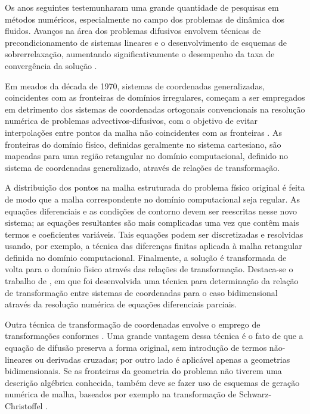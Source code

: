 Os anos seguintes testemunharam uma grande quantidade de pesquisas em métodos numéricos, especialmente no campo dos problemas de dinâmica dos fluidos. Avanços na área dos
problemas difusivos envolvem técnicas de precondicionamento de sistemas lineares e o desenvolvimento de esquemas de sobrerrelaxação, aumentando significativamente
o desempenho da taxa de convergência da solução \citep{artigo_frankel, artigo_fedorenko}.

Em meados da década de 1970, sistemas de coordenadas generalizadas, coincidentes com as fronteiras de domínios irregulares,
começam a ser empregados em detrimento dos sistemas de coordenadas ortogonais convencionais na resolução numérica de problemas advectivos-difusivos,
com o objetivo de evitar interpolações entre pontos da malha não coincidentes com as fronteiras \citep{livro_maliska}. As fronteiras do domínio físico, definidas geralmente no sistema 
cartesiano, são mapeadas para uma região retangular no domínio computacional, definido no sistema de coordenadas generalizado, através de relações de transformação.

A distribuição dos pontos na malha estruturada do problema físico original é feita de modo que a malha correspondente no domínio computacional seja regular. 
As equações diferenciais e as condições de contorno devem ser reescritas nesse novo sistema; as equações resultantes são mais complicadas uma vez que contêm mais
termos e coeficientes variáveis. Tais equações podem ser discretizadas e resolvidas usando, por exemplo, a técnica das diferenças finitas aplicada à malha retangular definida no domínio computacional.
Finalmente, a solução é transformada de volta para o domínio físico através das relações de transformação. Destaca-se o trabalho de \citet{artigo_thompson},
em que foi desenvolvida uma técnica para determinação da relação de transformação entre sistemas de coordenadas para o caso bidimensional através da resolução numérica de equações diferenciais parciais.

Outra técnica de transformação de coordenadas envolve o emprego de transformações conformes \citep{livro_numerical_grid}. Uma grande vantagem
dessa técnica é o fato de que a equação de difusão preserva a forma original, sem introdução de termos não-lineares ou derivadas cruzadas;
por outro lado é aplicável apenas a geometrias bidimensionais. Se as fronteiras da geometria do problema não tiverem uma descrição algébrica
conhecida, também deve se fazer uso de esquemas de geração numérica de malha, baseados por exemplo na transformação de Schwarz-Christoffel \citep{livro_brown}.

